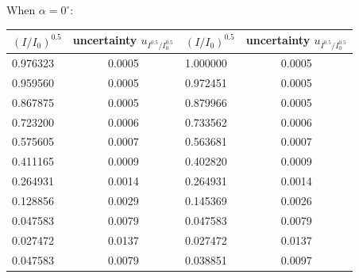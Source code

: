 \documentclass[12pt, a4paper]{article}
\begin{document}
When $\alpha = 0^{\circ}$:
\begin{table}[H]
	\centering
	\begin{tabular}{|l|cl|l|cl|}
	\hline
	$(I/I_0)^{0.5}$ & \multicolumn{2}{c|}{uncertainty   $u_{I^{0.5}/I_0^{0.5}}$} & $(I/I_0)^{0.5}$ & \multicolumn{2}{c|}{uncertainty   $u_{I^{0.5}/I_0^{0.5}}$} \\ \hline
	0.976323        & \multicolumn{2}{c|}{0.0005}                                & 1.000000        & \multicolumn{2}{c|}{0.0005}                                \\ \hline
	0.959560        & \multicolumn{2}{c|}{0.0005}                                & 0.972451        & \multicolumn{2}{c|}{0.0005}                                \\ \hline
	0.867875        & \multicolumn{2}{c|}{0.0005}                                & 0.879966        & \multicolumn{2}{c|}{0.0005}                                \\ \hline
	0.723200        & \multicolumn{2}{c|}{0.0006}                                & 0.733562        & \multicolumn{2}{c|}{0.0006}                                \\ \hline
	0.575605        & \multicolumn{2}{c|}{0.0007}                                & 0.563681        & \multicolumn{2}{c|}{0.0007}                                \\ \hline
	0.411165        & \multicolumn{2}{c|}{0.0009}                                & 0.402820        & \multicolumn{2}{c|}{0.0009}                                \\ \hline
	0.264931        & \multicolumn{2}{c|}{0.0014}                                & 0.264931        & \multicolumn{2}{c|}{0.0014}                                \\ \hline
	0.128856        & \multicolumn{2}{c|}{0.0029}                                & 0.145369        & \multicolumn{2}{c|}{0.0026}                                \\ \hline
	0.047583        & \multicolumn{2}{c|}{0.0079}                                & 0.047583        & \multicolumn{2}{c|}{0.0079}                                \\ \hline
	0.027472        & \multicolumn{2}{c|}{0.0137}                                & 0.027472        & \multicolumn{2}{c|}{0.0137}                                \\ \hline
	0.047583        & \multicolumn{2}{c|}{0.0079}                                & 0.038851        & \multicolumn{2}{c|}{0.0097}                                \\ \hline

\end{tabular}
\end{table}
\end{document}
